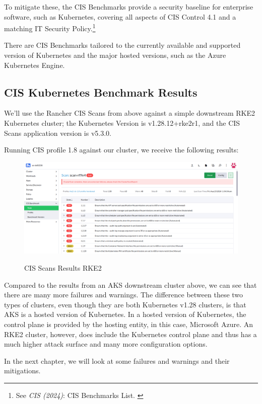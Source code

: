 To mitigate these, the CIS Benchmarks provide a security baseline for enterprise software, such as Kubernetes, covering all aspects of CIS Control 4.1 and a matching IT Security Policy.\footnote{See \textit{CIS (2024)}: CIS Benchmarks List. \cite{cisBenchmarks}}

There are CIS Benchmarks tailored to the currently available and supported version of Kubernetes and the major hosted versions, such as the Azure Kubernetes Engine.

\subsection{CIS Kubernetes Benchmark Results}

We'll use the Rancher CIS Scans from above against a simple downstream RKE2 Kubernetes cluster; the Kubernetes Version is v1.28.12+rke2r1, and the CIS Scans application version is v5.3.0.

Running CIS profile 1.8 against our cluster, we receive the following results:

\begin{figure}[H]
\centering
\caption {CIS Scans Results RKE2}
\includegraphics[width=\linewidth]{images/cis-scans-3.png}
\label{fig:cisRKE2}
\end{figure}

Compared to the results from an AKS downstream cluster above, we can see that there are many more failures and warnings. The difference between these two types of clusters, even though they are both Kubernetes v1.28 clusters, is that AKS is a hosted version of Kubernetes. In a hosted version of Kubernetes, the control plane is provided by the hosting entity, in this case, Microsoft Azure. An RKE2 cluster, however, does include the Kubernetes control plane and thus has a much higher attack surface and many more configuration options.

In the next chapter, we will look at some failures and warnings and their mitigations.
